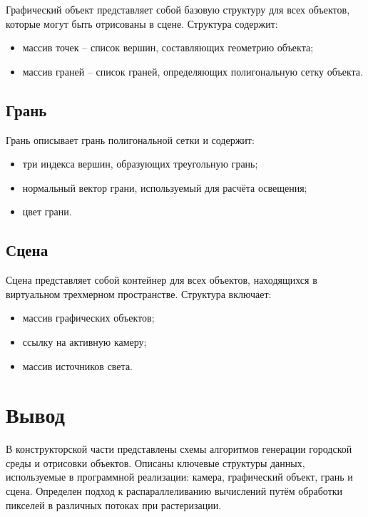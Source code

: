 Графический объект представляет собой базовую структуру для всех объектов, которые могут быть отрисованы в сцене. Структура содержит:
\begin{itemize}
	\item массив точек -- список вершин, составляющих геометрию объекта;
	\item массив граней -- список граней, определяющих полигональную сетку объекта.
\end{itemize}

\subsection*{Грань}

Грань описывает грань полигональной сетки и содержит:
\begin{itemize}
	\item три индекса вершин, образующих треугольную грань;
	\item нормальный вектор грани, используемый для расчёта освещения;
	\item цвет грани.
\end{itemize}

\subsection*{Сцена}

Сцена представляет собой контейнер для всех объектов, находящихся в виртуальном трехмерном пространстве. Структура включает:
\begin{itemize}
	\item массив графических объектов;
	\item ссылку на активную камеру;
	\item массив источников света.
\end{itemize}


\section*{Вывод}
В конструкторской части представлены схемы алгоритмов генерации городской среды и отрисовки объектов. Описаны ключевые структуры данных, используемые в программной реализации: камера, графический объект, грань и сцена. Определен подход к распараллеливанию вычислений путём обработки пикселей в различных потоках при растеризации.